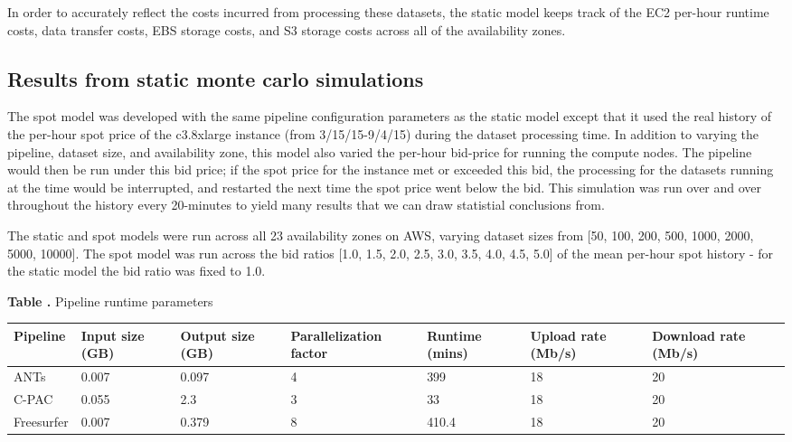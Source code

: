 \documentclass{frontiersSCNS} %
\begin{document}
In order to accurately reflect the costs incurred from processing these datasets, the static model keeps track of the EC2 per-hour runtime costs, data transfer costs, EBS storage costs, and S3 storage costs across all of the availability zones.

\subsection{Results from static monte carlo simulations}

The spot model was developed with the same pipeline configuration parameters as the static model except that it used the real history of the per-hour spot price of the c3.8xlarge instance (from 3/15/15-9/4/15) during the dataset processing time. In addition to varying the pipeline, dataset size, and availability zone, this model also varied the per-hour bid-price for running the compute nodes. The pipeline would then be run under this bid price; if the spot price for the instance met or exceeded this bid, the processing for the datasets running at the time would be interrupted, and restarted the next time the spot price went below the bid. This simulation was run over and over throughout the history every 20-minutes to yield many results that we can draw statistial conclusions from.

The static and spot models were run across all 23 availability zones on AWS, varying dataset sizes from [50, 100, 200, 500, 1000, 2000, 5000, 10000]. The spot model was run across the bid ratios [1.0, 1.5, 2.0, 2.5, 3.0, 3.5, 4.0, 4.5, 5.0] of the mean per-hour spot history - for the static model the bid ratio was fixed to 1.0.

\begin{table}[!ht]
\textbf{\label{Tab:03} Table .}{ Pipeline runtime parameters}

\processtable{}
{\begin{tabular}{lllllll}\toprule
        Pipeline & Input size (GB) & Output size (GB) & Parallelization factor & Runtime (mins) & Upload rate (Mb/s) & Download rate (Mb/s)\\\midrule
        ANTs & 0.007 & 0.097 & 4 & 399 & 18 & 20\\
        C-PAC & 0.055 & 2.3 & 3 & 33 & 18 & 20\\
        Freesurfer & 0.007 & 0.379 & 8 & 410.4 & 18 & 20\\
\end{tabular}}{}
\end{table}
\end{document}
